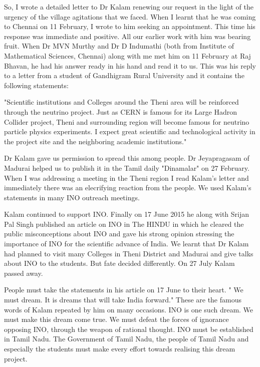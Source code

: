 So, I wrote a detailed letter to Dr Kalam renewing our request in the light
of the urgency of the village agitations that we faced. When I learnt that
he was coming to Chennai on 11 February, I wrote to him seeking an
appointment. This time his response was immediate and positive. All our
earlier work with him was bearing fruit. When Dr MVN Murthy and Dr D Indumathi
(both from Institute of Mathematical Sciences, Chennai) along with me met
him on 11 February at Raj Bhavan, he had his answer ready in his hand and
read it to us. This was his reply to a letter from a student of Gandhigram
Rural University and it contains the following statements:

"Scientific institutions and Colleges around the Theni area will be
reinforced through the neutrino project. Just as CERN is famous for
its Large Hadron Collider project, Theni and surrounding region will
become famous for neutrino particle physics experiments. I expect 
great scientific and technological activity in the project site
and the neighboring academic institutions."

Dr Kalam gave us permission to spread this among people. Dr Jeyapragasam of
Madurai helped us to publish it in the Tamil daily "Dinamalar" on 27 February.
When I was addressing a meeting in the Theni region I read Kalam's
letter and immediately there was an elecrifying reaction from the people.
We used Kalam's statements in many INO outreach meetings.

Kalam continued to support INO. Finally on 17 June 2015 he along with
Srijan Pal Singh published an article on INO in The HINDU
in which he cleared the public misconceptions about INO and gave his
strong opinion stressing the importance of INO for the scientific advance
of India. We learnt that Dr Kalam had planned to visit many Colleges in Theni
District and Madurai and give talks about INO to the students. But
fate decided differently. On 27 July Kalam passed away.

People must take the statements in his article on 17 June
to their heart. " We must dream. It is dreams that will
take India forward." These are the famous words of Kalam repeated  
by him on many occasions. INO is one such dream. We must make this
dream come true. We must defeat the forces of ignorance opposing INO,
through the weapon of rational thought. INO must be
established in Tamil Nadu. The Government of Tamil Nadu, the people
of Tamil Nadu and especially the students must make every effort
towards realising this dream project.  
